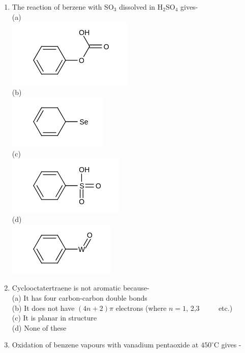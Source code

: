 \documentclass[10pt]{article}
\begin{document}
\begin{enumerate}
  \item The reaction of berzene with $\mathrm{SO}_{3}$ dissolved in $\mathrm{H}_{2} \mathrm{SO}_{4}$ gives-\\
(a)\\
\includegraphics{smile-39425fbaae9146164ab04abead5f2fe74efe6b00}\\
(b)\\
\includegraphics{smile-de3e2a7ed9b1280bfd7453b905d54f55ea00923a}\\
(c)\\
\includegraphics{smile-a52e59617c5db3b284decc8a08e7588236e07de0}\\
(d)\\
\includegraphics{smile-6590dfda44987cae2f80a6fde031ea3ed1b472e6}
  \item Cyclooctatertraene is not aromatic because-\\
(a) It has four carbon-carbon double bonds\\
(b) It does not have $(4 n+2) \pi$ electrons (where $n=1$, 2,3 $\qquad$ etc.)\\
(c) It is planar in structure\\
(d) None of these
  \item Oxidation of benzene vapours with vanadium pentaoxide at $450^{\circ} \mathrm{C}$ gives -\\

\end{enumerate}
\end{document}
